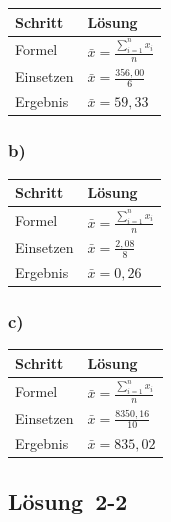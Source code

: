 \documentclass[
  11pt,
  ngerman,
  a4paper,
]{report}
\begin{document}
\begin{table}[H]
\centering
\begin{tabular}{ll}
\toprule
\textbf{Schritt} & \textbf{Lösung}\\
\midrule
Formel & $\bar{x}=\frac{\sum\limits_{i=1}^{n}x_{i}}{n}$\\
Einsetzen & $\bar{x}=\frac{356{,}00}{6}$\\
Ergebnis & $\bar{x}=59{,}33$\\
\bottomrule
\end{tabular}
\end{table}

\hypertarget{b-2}{%
\subsubsection{b)}\label{b-2}}

\begin{table}[H]
\centering
\begin{tabular}{ll}
\toprule
\textbf{Schritt} & \textbf{Lösung}\\
\midrule
Formel & $\bar{x}=\frac{\sum\limits_{i=1}^{n}x_{i}}{n}$\\
Einsetzen & $\bar{x}=\frac{2{,}08}{8}$\\
Ergebnis & $\bar{x}=0{,}26$\\
\bottomrule
\end{tabular}
\end{table}

\hypertarget{c-2}{%
\subsubsection{c)}\label{c-2}}

\begin{table}[H]
\centering
\begin{tabular}{ll}
\toprule
\textbf{Schritt} & \textbf{Lösung}\\
\midrule
Formel & $\bar{x}=\frac{\sum\limits_{i=1}^{n}x_{i}}{n}$\\
Einsetzen & $\bar{x}=\frac{8350{,}16}{10}$\\
Ergebnis & $\bar{x}=835{,}02$\\
\bottomrule
\end{tabular}
\end{table}

\hypertarget{loesung-2-2}{%
\subsection{Lösung~2-2}\label{loesung-2-2}}
\end{document}
